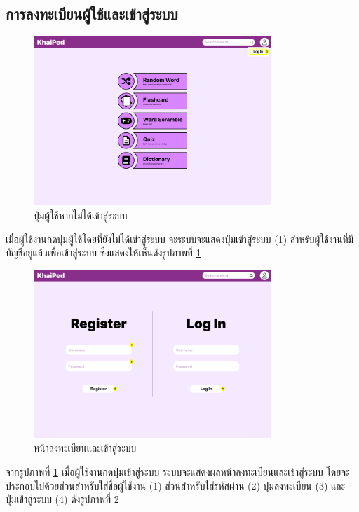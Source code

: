 \documentclass[12pt,oneside,openright,a4paper]{cpe-thai-project}
\begin{document}
\subsection{การลงทะเบียนผู้ใช้และเข้าสู่ระบบ}
\begin{figure}[!h]\centering
	\includegraphics[width=0.8\textwidth, keepaspectratio=true]{image/chap3/ui/login/Home page - Guest User Button.png}
	\caption{ปุ่มผู้ใช้หากไม่ได้เข้าสู่ระบบ}\label{fig:UI_GuestButton}
\end{figure}
\hspace{1cm}
เมื่อผู้ใช้งานกดปุ่มผู้ใช้โดยที่ยังไม่ได้เข้าสู่ระบบ จะระบบจะแสดงปุ่มเข้าสู่ระบบ (1) สำหรับผู้ใช้งานที่มีบัญชีอยู่แล้วเพื่อเข้าสู่ระบบ 
ซึ่งแสดงให้เห็นดังรูปภาพที่ \ref{fig:UI_GuestButton}

\begin{figure}[!h]\centering
	\includegraphics[width=0.8\textwidth, keepaspectratio=true]{image/chap3/ui/login/Home page - Register.png}
	\caption{หน้าลงทะเบียนและเข้าสู่ระบบ}\label{fig:UI_LoginPage}
\end{figure}
\hspace{1cm}
จากรูปภาพที่ \ref{fig:UI_GuestButton} เมื่อผู้ใช้งานกดปุ่มเข้าสู่ระบบ ระบบจะแสดงผลหน้าลงทะเบียนและเข้าสู่ระบบ โดยจะประกอบไปด้วยส่วนสำหรับใส่ชื่อผู้ใช้งาน (1)
ส่วนสำหรับใส่รหัสผ่าน (2) ปุ่มลงทะเบียน (3) และ ปุ่มเข้าสู่ระบบ (4) ดังรูปภาพที่ \ref{fig:UI_LoginPage}
\end{document}
